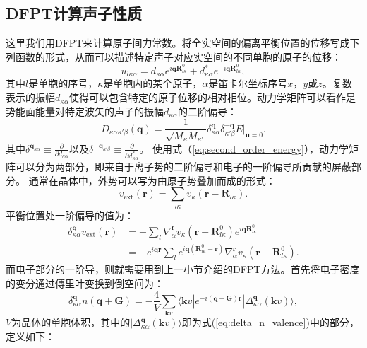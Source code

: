 \subsection{DFPT计算声子性质}
这里我们用DFPT来计算原子间力常数。将全实空间的偏离平衡位置的位移写成下列函数的形式，从而可以描述特定声子对应实空间的不同单胞的原子的位移：
\begin{equation}
  u_{l\kappa\alpha} = d_{\kappa\alpha}e^{i\bm{q}\bm{R}^0_{l\kappa}} + d^*_{\kappa\alpha}e^{-i\bm{q}\bm{R}^0_{l\kappa}},
\end{equation}
其中$l$是单胞的序号，$\kappa$是单胞内的某个原子，$\alpha$是笛卡尔坐标序号$x$，$y$或$z$。复数表示的振幅$d_{\kappa\alpha}$使得可以包含特定的原子位移的相对相位。动力学矩阵可以看作是势能面能量对特定波矢的声子的振幅$d_{\kappa\alpha}$的二阶偏导：
\begin{equation}
  D_{\kappa\alpha\kappa'\beta}(\bm{q}) =
  \frac{1}{\sqrt{M_\kappa M_{\kappa'}}} \delta^{\bm{q}}_{\kappa\alpha} \delta^{-\bm{q}}_{\kappa'\beta} E \bigg|_{\bm{u}=0}.
\end{equation}
其中$\delta^{\bm{q}_{\kappa\alpha}}\equiv \frac{\partial}{\partial d_{\kappa\alpha}}$以及$\delta^{\bm{-q}_{\kappa'\beta}}\equiv \frac{\partial}{\partial d^*_{\kappa\alpha}}$。
使用式（\ref{eq:second_order_energy}），动力学矩阵可以分为两部分，即来自于离子势的二阶偏导和电子的一阶偏导所贡献的屏蔽部分。
通常在晶体中，外势可以写为由原子势叠加而成的形式：
\begin{equation}
  v_\mathrm{ext}(\bm{r}) = \sum_{l\kappa} v_\kappa (\bm{r}-\bm{R}_{l\kappa}).
\end{equation}
平衡位置处一阶偏导的值为：
\begin{align}
  \delta^{\bm{q}}_{\kappa\alpha}v_{\mathrm{ext}}(\bm{r}) &=
  - \sum_l \nabla^{\bm{r}}_\alpha v_\kappa (\bm{r}-\bm{R}^0_{l\kappa})e^{i\bm{q}\bm{R}^0_{l\kappa}} \\
  &= -e^{i\bm{qr}} \sum_l e^{i\bm{q} (\bm{R}^0_{l\kappa}-\bm{r})} \nabla^{\bm{r}}_\alpha v_\kappa(\bm{r}-\bm{R}^0_{l\kappa}).
\end{align}
而电子部分的一阶导，则就需要用到上一小节介绍的DFPT方法。首先将电子密度的变分通过傅里叶变换到倒空间为：
\begin{equation}\label{eq:dfpt_scf01}
  \delta^{\bm{q}}_{\kappa\alpha} n(\bm{q}+\bm{G}) = - \frac{4}{V}\sum_{\bm{k}v} \langle \bm{k}v| e^{-i(\bm{q}+\bm{G})\bm{r}}| \Delta^{\bm{q}}_{\kappa\alpha}(\bm{k}v) \rangle,
\end{equation}
$V$为晶体的单胞体积，其中的$|\Delta^{\bm{q}}_{\kappa\alpha}(\bm{k}v) \rangle$即为式(\ref{eq:delta_n_valence})中的部分，定义如下：
